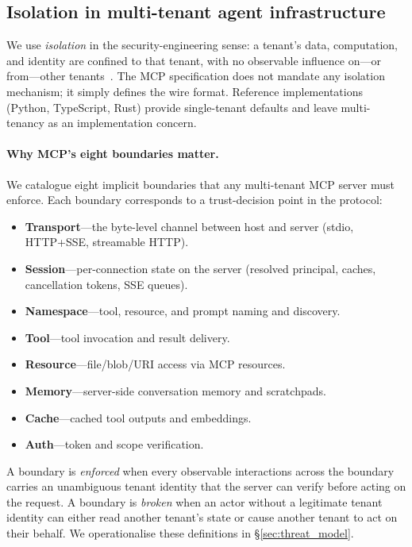 \subsection{Isolation in multi-tenant agent infrastructure}

We use \emph{isolation} in the security-engineering sense: a
tenant's data, computation, and identity are confined to that
tenant, with no observable influence on---or from---other
tenants~\cite{nist_sp_800_207}. The MCP specification does not
mandate any isolation mechanism; it simply defines the wire
format. Reference implementations (Python, TypeScript, Rust)
provide single-tenant defaults and leave multi-tenancy as an
implementation concern.

\paragraph{Why MCP's eight boundaries matter.}
We catalogue eight implicit boundaries that any multi-tenant
MCP server must enforce. Each boundary corresponds to a
trust-decision point in the protocol:

\begin{itemize}
  \item \textbf{Transport}---the byte-level channel between host
        and server (stdio, HTTP+SSE, streamable HTTP).
  \item \textbf{Session}---per-connection state on the server
        (resolved principal, caches, cancellation tokens, SSE
        queues).
  \item \textbf{Namespace}---tool, resource, and prompt naming
        and discovery.
  \item \textbf{Tool}---tool invocation and result delivery.
  \item \textbf{Resource}---file/blob/URI access via MCP
        resources.
  \item \textbf{Memory}---server-side conversation memory and
        scratchpads.
  \item \textbf{Cache}---cached tool outputs and embeddings.
  \item \textbf{Auth}---token and scope verification.
\end{itemize}

A boundary is \emph{enforced} when every observable
interactions across the boundary carries an unambiguous
tenant identity that the server can verify before acting on the
request. A boundary is \emph{broken} when an actor without a
legitimate tenant identity can either read another tenant's
state or cause another tenant to act on their behalf. We
operationalise these definitions in \S\ref{sec:threat_model}.

